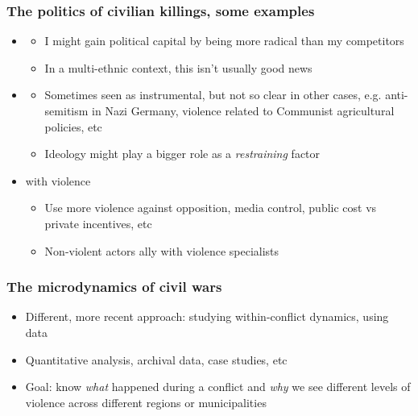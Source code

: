 \documentclass[aspectratio=43]{beamer}
\begin{document}
\begin{frame}
\frametitle{The politics of civilian killings, some examples}
\centering

\begin{itemize}
  \item<1-> 
  \begin{itemize}
    \item I might gain political capital by being more radical than my competitors
    \item In a multi-ethnic context, this isn't usually good news
  \end{itemize}
  \item<2-> 
  \begin{itemize}
    \item Sometimes seen as instrumental, but not so clear in other cases, e.g. anti-semitism in Nazi Germany, violence related to Communist agricultural policies, etc
    \item Ideology might play a bigger role as a \textit{restraining} factor
  \end{itemize}
  \item<3->  with violence
  \begin{itemize}
    \item Use more violence against opposition, media control, public cost vs private incentives, etc
    \item Non-violent actors ally with violence specialists
  \end{itemize}
  \end{itemize}

\end{frame}


\begin{frame}
\frametitle{The microdynamics of civil wars}
\centering

\begin{itemize}[<+->]
  \item Different, more recent approach: studying within-conflict dynamics, using  data
  \item Quantitative analysis, archival data, case studies, etc
  \item Goal: know \textit{what} happened during a conflict and \textit{why} we see different levels of violence across different regions or municipalities
\end{itemize}

\end{frame}
\end{document}

